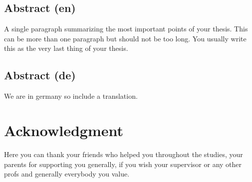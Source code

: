 
\section*{Abstract (en)}
A single paragraph summarizing the most important points of your thesis.
This can be more than one paragraph but should not be too long.
You usually write this as the very last thing of your thesis.

\section*{Abstract (de)}
We are in germany so include a translation.

\newpage
\chapter*{Acknowledgment}
Here you can thank your friends who helped you throughout the studies, your parents for supporting you generally, if you wish your supervisor or any other profs and generally everybody you value.
